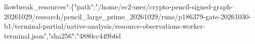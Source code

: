 \documentclass[10pt]{article}
\begin{document}
llowbreak{}\_\allowbreak{}r\allowbreak{}e\allowbreak{}s\allowbreak{}o\allowbreak{}u\allowbreak{}r\allowbreak{}c\allowbreak{}e\allowbreak{}s\allowbreak{}"\allowbreak{}:\allowbreak{}\{\allowbreak{}"\allowbreak{}p\allowbreak{}a\allowbreak{}t\allowbreak{}h\allowbreak{}"\allowbreak{}:\allowbreak{}"\allowbreak{}/\allowbreak{}h\allowbreak{}o\allowbreak{}m\allowbreak{}e\allowbreak{}/\allowbreak{}e\allowbreak{}c\allowbreak{}2\allowbreak{}-\allowbreak{}u\allowbreak{}s\allowbreak{}e\allowbreak{}r\allowbreak{}/\allowbreak{}c\allowbreak{}r\allowbreak{}y\allowbreak{}p\allowbreak{}t\allowbreak{}o\allowbreak{}-\allowbreak{}p\allowbreak{}e\allowbreak{}n\allowbreak{}c\allowbreak{}i\allowbreak{}l\allowbreak{}-\allowbreak{}s\allowbreak{}i\allowbreak{}g\allowbreak{}n\allowbreak{}e\allowbreak{}d\allowbreak{}-\allowbreak{}g\allowbreak{}r\allowbreak{}a\allowbreak{}p\allowbreak{}h\allowbreak{}-\allowbreak{}2\allowbreak{}0\allowbreak{}2\allowbreak{}6\allowbreak{}1\allowbreak{}0\allowbreak{}2\allowbreak{}9\allowbreak{}/\allowbreak{}r\allowbreak{}e\allowbreak{}s\allowbreak{}e\allowbreak{}a\allowbreak{}r\allowbreak{}c\allowbreak{}h\allowbreak{}/\allowbreak{}p\allowbreak{}e\allowbreak{}n\allowbreak{}c\allowbreak{}i\allowbreak{}l\allowbreak{}\_\allowbreak{}l\allowbreak{}a\allowbreak{}r\allowbreak{}g\allowbreak{}e\allowbreak{}\_\allowbreak{}p\allowbreak{}r\allowbreak{}i\allowbreak{}m\allowbreak{}e\allowbreak{}\_\allowbreak{}2\allowbreak{}0\allowbreak{}2\allowbreak{}6\allowbreak{}1\allowbreak{}0\allowbreak{}2\allowbreak{}9\allowbreak{}/\allowbreak{}r\allowbreak{}u\allowbreak{}n\allowbreak{}s\allowbreak{}/\allowbreak{}p\allowbreak{}1\allowbreak{}8\allowbreak{}6\allowbreak{}3\allowbreak{}7\allowbreak{}9\allowbreak{}-\allowbreak{}g\allowbreak{}a\allowbreak{}t\allowbreak{}e\allowbreak{}-\allowbreak{}2\allowbreak{}0\allowbreak{}2\allowbreak{}6\allowbreak{}1\allowbreak{}0\allowbreak{}3\allowbreak{}0\allowbreak{}-\allowbreak{}b\allowbreak{}1\allowbreak{}/\allowbreak{}t\allowbreak{}e\allowbreak{}r\allowbreak{}m\allowbreak{}i\allowbreak{}n\allowbreak{}a\allowbreak{}l\allowbreak{}-\allowbreak{}p\allowbreak{}a\allowbreak{}r\allowbreak{}t\allowbreak{}i\allowbreak{}a\allowbreak{}l\allowbreak{}/\allowbreak{}n\allowbreak{}a\allowbreak{}t\allowbreak{}i\allowbreak{}v\allowbreak{}e\allowbreak{}-\allowbreak{}a\allowbreak{}n\allowbreak{}a\allowbreak{}l\allowbreak{}y\allowbreak{}s\allowbreak{}i\allowbreak{}s\allowbreak{}/\allowbreak{}r\allowbreak{}e\allowbreak{}s\allowbreak{}o\allowbreak{}u\allowbreak{}r\allowbreak{}c\allowbreak{}e\allowbreak{}-\allowbreak{}o\allowbreak{}b\allowbreak{}s\allowbreak{}e\allowbreak{}r\allowbreak{}v\allowbreak{}a\allowbreak{}t\allowbreak{}i\allowbreak{}o\allowbreak{}n\allowbreak{}s\allowbreak{}-\allowbreak{}w\allowbreak{}o\allowbreak{}r\allowbreak{}k\allowbreak{}e\allowbreak{}r\allowbreak{}-\allowbreak{}t\allowbreak{}e\allowbreak{}r\allowbreak{}m\allowbreak{}i\allowbreak{}n\allowbreak{}a\allowbreak{}l\allowbreak{}.\allowbreak{}j\allowbreak{}s\allowbreak{}o\allowbreak{}n\allowbreak{}"\allowbreak{},\allowbreak{}"\allowbreak{}s\allowbreak{}h\allowbreak{}a\allowbreak{}2\allowbreak{}5\allowbreak{}6\allowbreak{}"\allowbreak{}:\allowbreak{}"\allowbreak{}4\allowbreak{}8\allowbreak{}8\allowbreak{}0\allowbreak{}c\allowbreak{}c\allowbreak{}4\allowbreak{}4\allowbreak{}9\allowbreak{}b\allowbreak{}6\allowbreak{}d\
\end{document}
